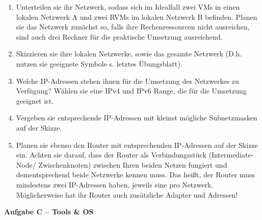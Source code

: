 \documentclass[paper=a4,fontsize=11pt]{scrartcl}%
\numberwithin{equation}{section}
\begin{document}
\begin{enumerate}
	\begin{enumerate}
		\item Unterteilen sie ihr Netzwerk, sodass sich im Idealfall zwei VMs in einen lokalen Netzwerk A und zwei RVMs im lokalen Netzwerk B befinden. Planen sie das Netzwerk zunächst so, falls ihre Rechenressourcen nicht ausreichen, sind auch drei Rechner für die praktische Umsetzung ausreichend.
		\item Skizzieren sie ihre lokalen Netzwerke, sowie das gesamte Netzwerk (D.h. nutzen sie geeignete Symbole s. letztes Übungsblatt).
		\item Welche IP-Adressen stehen ihnen für die Umsetzung des Netzwerkes zu Verfügung? Wählen sie eine IPv4 und IPv6 Range, die für die Umsetzung geeignet ist.
		\item Vergeben sie entsprechende IP-Adressen mit kleinst mögliche Subnetzmasken auf der Skizze.
		\item Planen sie ebenso den Router mit entsprechenden IP-Adressen auf der Skizze ein. Achten sie darauf, dass der Router als Verbindungsstück (Intermediate-Node/ Zwischenknoten) zwischen Ihren beiden Netzen fungiert und dementsprechend beide Netzwerke kennen muss. Das heißt, der Router muss mindestens zwei IP-Adressen haben, jeweils eine pro Netzwerk. Möglicherweise hat ihr Router auch zusätzliche Adapter und Adressen!
	\end{enumerate}
\end{enumerate}

\begin{center}
\Large{\textbf{Aufgabe C -- Tools \& OS}}
\end{center}
\vskip0.25in
\end{document}
